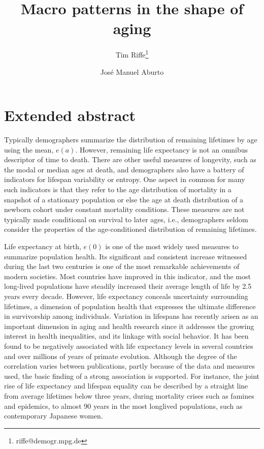 \documentclass{article}
\begin{document}
\title{Macro patterns in the shape of aging}

\author[1]{Tim Riffe\thanks{riffe@demogr.mpg.de}}
\author[2,3]{Jos\'e Manuel Aburto}

\maketitle

\begin{abstract}

\end{abstract}

\section*{Extended abstract}

Typically demographers summarize the distribution of remaining
lifetimes by age using the mean, $e(a)$. However, remaining life
expectancy is not an omnibus descriptor of time to death. There are other
useful measures of longevity, such as the modal or median ages at death, and demographers also have a battery of
indicators for lifespan variability or entropy. One aspect in common for many
such indicators is that they refer to the age distribution of mortality in a snapshot of a stationary population or else the age at death distribution of a newborn cohort under constant mortality
conditions. These measures are not typically made conditional on survival to
later ages, i.e., demographers seldom consider the properties of the
age-conditioned distribution of remaining lifetimes. 

Life expectancy at birth, $e(0)$ is one of the most widely used measures to
summarize population health. Its significant and consistent increase witnessed during the last two centuries is one of the most remarkable achievements of modern societies. Most countries have improved in this indicator, and the most long-lived populations have steadily increased their average length of life by 2.5 years every decade. However, life expectancy conceals uncertainty surrounding lifetimes, a dimension of population health that expresses the ultimate difference in survivorship among individuals. Variation in lifespans has recently arisen as an important dimension in aging and health research since it addresses the growing interest in health inequalities, and its linkage with social behavior. It has been found to be negatively associated with life expectancy levels in several countries and over millions of years of primate evolution. Although the degree of the correlation varies between publications, partly because of the data and measures used, the basic finding of a strong association is supported.  For instance, the joint rise of life expectancy and lifespan equality can be described by a straight line from average lifetimes below three years, during mortality crises such as famines and epidemics, to almost 90 years in the most longlived populations, such as contemporary Japanese women.
\end{document}
